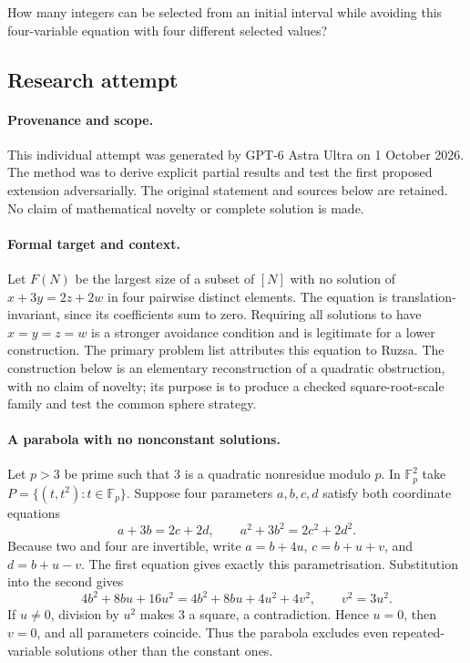 \documentclass[11pt,a4paper]{article}
\newcommand{\F}{\mathbb{F}}
\begin{document}
How many integers can be selected from an initial interval while avoiding this four-variable equation with four different selected values?

\subsection{Research attempt}

\paragraph{Provenance and scope.}
This individual attempt was generated by GPT-6 Astra Ultra on 1 October 2026. The method was to derive explicit partial results and test the first proposed extension adversarially. The original statement and sources below are retained. No claim of mathematical novelty or complete solution is made.

\paragraph{Formal target and context.}
Let $F(N)$ be the largest size of a subset of $[N]$ with no solution of $x+3y=2z+2w$ in four pairwise distinct elements. The equation is translation-invariant, since its coefficients sum to zero. Requiring all solutions to have $x=y=z=w$ is a stronger avoidance condition and is legitimate for a lower construction. The primary problem list attributes this equation to Ruzsa. The construction below is an elementary reconstruction of a quadratic obstruction, with no claim of novelty; its purpose is to produce a checked square-root-scale family and test the common sphere strategy.

\paragraph{A parabola with no nonconstant solutions.}
Let $p>3$ be prime such that $3$ is a quadratic nonresidue modulo $p$. In $\F_p^2$ take $P=\{(t,t^2):t\in\F_p\}$. Suppose four parameters $a,b,c,d$ satisfy both coordinate equations
\[
 a+3b=2c+2d,\qquad a^2+3b^2=2c^2+2d^2.
\]
Because two and four are invertible, write $a=b+4u$, $c=b+u+v$, and $d=b+u-v$. The first equation gives exactly this parametrisation. Substitution into the second gives
\[
 4b^2+8bu+16u^2=4b^2+8bu+4u^2+4v^2,
 \qquad v^2=3u^2.
\]
If $u\ne0$, division by $u^2$ makes $3$ a square, a contradiction. Hence $u=0$, then $v=0$, and all parameters coincide. Thus the parabola excludes even repeated-variable solutions other than the constant ones.
\end{document}
